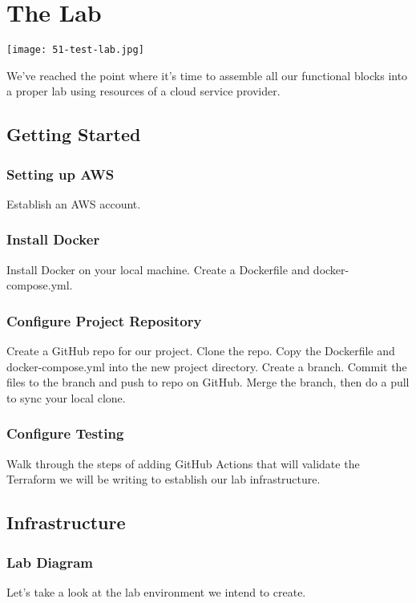 \chapter{The Lab}

\texttt{[image: 51-test-lab.jpg]}

\justifying
We've reached the point where it's time to assemble all our functional
blocks into a proper lab using resources of a cloud service provider.

\section{Getting Started}

\subsection{Setting up AWS}
\justifying
Establish an AWS account.

\subsection{Install Docker}
\justifying
Install Docker on your local machine. Create a Dockerfile and
docker-compose.yml.

\subsection{Configure Project Repository}
\justifying
Create a GitHub repo for our project. Clone the repo. Copy the
Dockerfile and docker-compose.yml into the new project directory. Create
a branch. Commit the files to the branch and push to repo on GitHub.
Merge the branch, then do a pull to sync your local clone.

\subsection{Configure Testing}
\justifying
Walk through the steps of adding GitHub Actions that will validate the
Terraform we will be writing to establish our lab infrastructure.

\section{Infrastructure}

\subsection{Lab Diagram}
\justifying
Let's take a look at the lab environment we intend to create.


